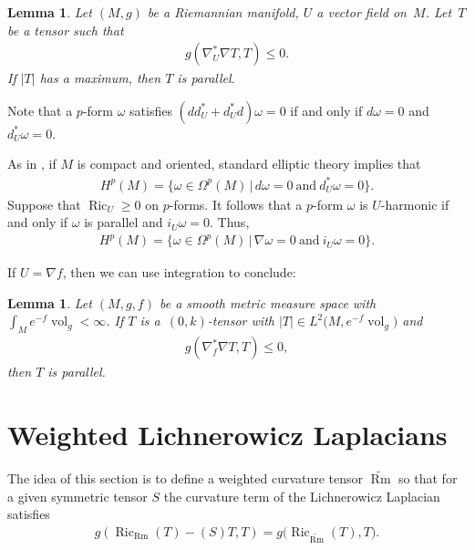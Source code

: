 \documentclass[pdftex]{sigma}
\numberwithin{equation}{section}
\newtheorem{Lemma}[Theorem]{Lemma}
\newcommand{\vol}{\operatorname{vol}}
\newcommand{\Ric} {\operatorname{Ric}}
\newcommand{\Rm} {\operatorname{Rm}}
\begin{document}
\begin{Lemma}\label{BochnerTechniqueWithDiffusion}
Let $(M,g)$ be a Riemannian manifold, $U$ a vector field on~$M$. Let~$T$ be a tensor such that
\begin{gather*}
g ( \nabla_U^{*} \nabla T, T) \leq 0.
\end{gather*}
If $| T |$ has a maximum, then $T$ is parallel.
\end{Lemma}

\begin{Remark}\label{IsomorphismDeRhamColomology}
Note that a $p$-form $\omega$ satisfies $(dd^{*}_U + d^{*}_Ud ) \omega = 0$ if and only if $d \omega =0$ and $d^{*}_U \omega = 0$.

As in \cite{LottGeometryBETensor}, if $M$ is compact and oriented, standard elliptic theory implies that
\begin{gather*}
H^p(M) = \big\lbrace \omega \in \Omega^p(M) \, \vert \, d \omega =0 \ \text{and} \ d^{*}_U \omega = 0 \big\rbrace.
\end{gather*}
Suppose that $\Ric_U \geq 0$ on $p$-forms. It follows that a $p$-form $\omega$ is $U$-harmonic if and only if $\omega$ is parallel and $i_U \omega = 0$. Thus,
\begin{gather*}
H^{p}(M)= \big\lbrace \omega \in \Omega^p(M) \, \vert \, \nabla \omega =0 \ \text{and} \ i_{U} \omega = 0 \big\rbrace.
\end{gather*}
\end{Remark}

If $U=\nabla f$, then we can use integration to conclude:

\begin{Lemma}\label{BochnerTechniqueSMMS}
Let $(M,g,f)$ be a smooth metric measure space with $\int_M e^{-f} \vol_g < \infty$. If $T$ is a~$(0,k)$-tensor with $|T| \in L^{2}\big(M, e^{-f} \vol_g\big)$ and
\begin{gather*}
g ( \nabla_f^{*} \nabla T, T) \leq 0,
\end{gather*}
then $T$ is parallel.
\end{Lemma}

\section{Weighted Lichnerowicz Laplacians}

The idea of this section is to define a weighted curvature tensor $\widetilde{\Rm}$ so that for a given symmetric tensor $S$ the curvature term of the Lichnerowicz Laplacian satisfies
\begin{gather*}
g( \Ric_{\Rm}(T) - (S)T, T ) = g\big( \Ric_{\widetilde{\Rm}}(T),T\big).
\end{gather*}
\end{document}
